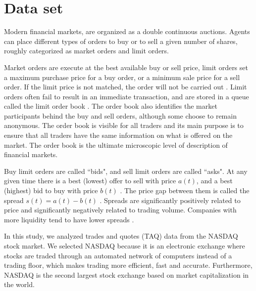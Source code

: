 \section{Data set}\label{sec:data}

Modern financial markets, are organized as a double continuous auctions. Agents
can place different types of orders to buy or to sell a given number of shares,
roughly categorized as market orders and limit orders.

Market orders are execute at the best available buy or sell price, limit orders
set a maximum purchase price for a buy order, or a minimum sale price for a
sell order. If the limit price is not matched, the order will not be carried
out
\cite{large_prices_changes,predictive_pow,intro_market_micro,stat_theory}.
Limit orders often fail to result in an immediate transaction, and are stored
in a queue called the limit order book
\cite{stat_prop,predictive_pow,intro_market_micro,prop_order_book}. The order
book also identifies the market participants behind the buy and sell orders,
although some choose to remain anonymous. The order book is visible for all
traders and its main purpose is to ensure that all traders have the same
information on what is offered on the market. The order book is the ultimate
microscopic level of description of financial markets.

Buy limit orders are called ``bids", and sell limit orders are called ``asks".
At any given time there is a best (lowest) offer to sell with price
$a\left(t\right)$, and a best (highest) bid to buy with price $b\left(t\right)$
\cite{subtle_nature,account_spread,limit_ord_spread,prop_order_book,stat_theory}.
The price gap between them is called the spread
$s\left(t\right) = a\left(t\right)-b\left(t\right)$
\cite{subtle_nature,market_digest,Bouchaud_2004,account_spread,em_stylized_facts,large_prices_changes,stat_theory}.
Spreads are significantly positively related to price and significantly
negatively related to trading volume. Companies with more liquidity tend to
have lower spreads
\cite{components_spread_tokyo,effects_spread,account_spread,components_spread}.

In this study, we analyzed trades and quotes (TAQ) data from the NASDAQ stock
market. We selected NASDAQ because it is an electronic exchange where stocks
are traded through an automated network of computers instead of a trading
floor, which makes trading more efficient, fast and accurate. Furthermore,
NASDAQ is the second largest stock exchange based on market capitalization
in the world.

